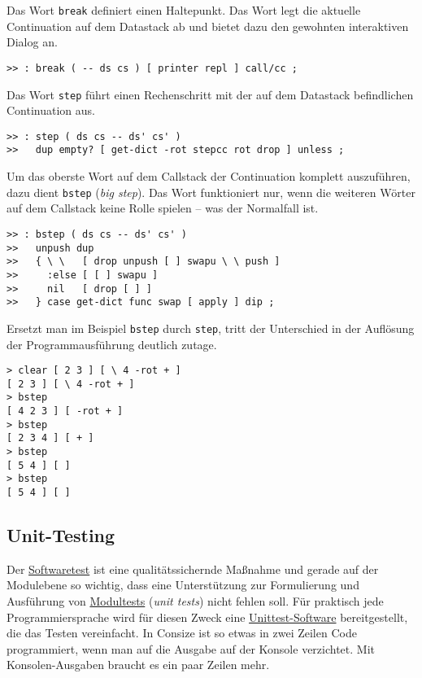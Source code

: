 Das Wort \verb|break| definiert einen Haltepunkt. Das Wort legt die aktuelle Continuation auf dem Datastack ab und bietet dazu den gewohnten interaktiven Dialog an.

\begin{verbatim}
>> : break ( -- ds cs ) [ printer repl ] call/cc ;
\end{verbatim}

Das Wort \verb|step| führt einen Rechenschritt mit der auf dem Datastack befindlichen Continuation aus.

\begin{verbatim}
>> : step ( ds cs -- ds' cs' )
>>   dup empty? [ get-dict -rot stepcc rot drop ] unless ;
\end{verbatim}

Um das oberste Wort auf dem Callstack der Continuation komplett auszuführen, dazu dient \verb|bstep| (\emph{big step}). Das Wort funktioniert nur, wenn die weiteren Wörter auf dem Callstack keine Rolle spielen -- was der Normalfall ist.

\begin{verbatim}
>> : bstep ( ds cs -- ds' cs' )
>>   unpush dup
>>   { \ \   [ drop unpush [ ] swapu \ \ push ]
>>     :else [ [ ] swapu ]
>>     nil   [ drop [ ] ]
>>   } case get-dict func swap [ apply ] dip ;
\end{verbatim}

Ersetzt man im Beispiel \verb|bstep| durch \verb|step|, tritt der Unterschied in der Auflösung der Programmausführung deutlich zutage.

\begin{verbatim}
> clear [ 2 3 ] [ \ 4 -rot + ]
[ 2 3 ] [ \ 4 -rot + ]
> bstep
[ 4 2 3 ] [ -rot + ]
> bstep
[ 2 3 4 ] [ + ]
> bstep
[ 5 4 ] [ ]
> bstep
[ 5 4 ] [ ]
\end{verbatim}

\subsection{Unit-Testing}

Der \href{http://de.wikipedia.org/wiki/Softwaretest}{Softwaretest} ist eine qualitätssichernde Maßnahme und gerade auf der Modulebene so wichtig, dass eine Unterstützung zur Formulierung und Ausführung von \href{http://de.wikipedia.org/wiki/Modultest}{Modultests} (\emph{unit tests}) nicht fehlen soll. Für praktisch jede Programmiersprache wird für diesen Zweck eine \href{http://de.wikipedia.org/wiki/Liste\_von\_Modultest-Software}{Unittest-Soft\-ware} bereitgestellt, die das Testen vereinfacht. In Consize ist so etwas in zwei Zeilen Code programmiert, wenn man auf die Ausgabe auf der Konsole verzichtet. Mit Konsolen-Ausgaben braucht es ein paar Zeilen mehr.

